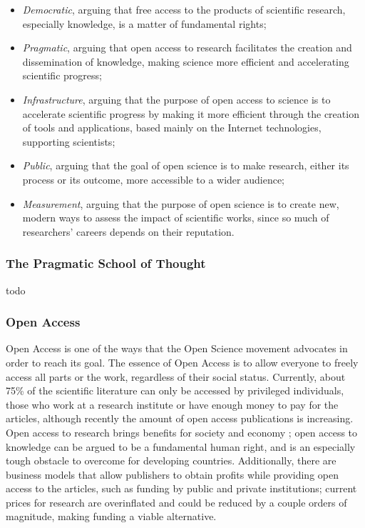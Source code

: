 \documentclass[12pt]{article}
\begin{document}
\begin{itemize}
\item \emph{Democratic}, arguing that free access to the products of scientific research, especially knowledge, is a matter of fundamental rights;
\item \emph{Pragmatic}, arguing that open access to research facilitates the creation and dissemination of knowledge, making science more efficient and accelerating scientific progress;
\item \emph{Infrastructure}, arguing that the purpose of open access to science is to accelerate scientific progress by making it more efficient through the creation of tools and applications, based mainly on the Internet technologies, supporting scientists;
\item \emph{Public}, arguing that the goal of open science is to make research, either its process or its outcome, more accessible to a wider audience;
\item \emph{Measurement}, arguing that the purpose of open science is to create new, modern ways to assess the impact of scientific works, since so much of researchers' careers depends on their reputation.
\end{itemize}

\subsubsection{The Pragmatic School of Thought}
\label{sec:orgbf09334}
todo


\subsubsection{Open Access}
\label{sec:orge820282}
Open Access is one of the ways that the Open Science movement advocates in order to reach its goal. The essence of Open Access is to allow everyone to freely access all parts or the work, regardless of their social status. Currently, about 75\% of the scientific literature can only be accessed by privileged individuals, those who work at a research institute or have enough money to pay for the articles, although recently the amount of open access publications is increasing. Open access to research brings benefits for society \cite{openaccessimpact} and economy \cite{diffknowl}; open access to knowledge can be argued to be a fundamental human right, and is an especially tough obstacle to overcome for developing countries. Additionally, there are business models that allow publishers to obtain profits while providing open access to the articles, such as funding by public and private institutions; current prices for research are overinflated and could be reduced by a couple orders of magnitude, making funding a viable alternative.
\end{document}
